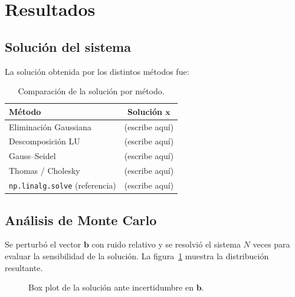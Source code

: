 \section{Resultados}
\label{sec:resultados}

% 

\subsection{Solución del sistema}
La solución obtenida por los distintos métodos fue:

\begin{table}[h]
	\centering
	\begin{tabular}{lc}
		\toprule
		Método & Solución $\mathbf{x}$ \\
		\midrule
		Eliminación Gaussiana & (escribe aquí) \\
		Descomposición LU     & (escribe aquí) \\
		Gauss--Seidel         & (escribe aquí) \\
		Thomas / Cholesky     & (escribe aquí) \\
		\texttt{np.linalg.solve} (referencia) & (escribe aquí) \\
		\bottomrule
	\end{tabular}
	\caption{Comparación de la solución por método.}
	\label{tab:metodos}
\end{table}

\subsection{Análisis de Monte Carlo}
Se perturbó el vector $\mathbf{b}$ con ruido relativo y se resolvió el sistema $N$ veces
para evaluar la sensibilidad de la solución. La figura~\ref{fig:montecarlo} muestra la
distribución resultante.

\begin{figure}[h]
	\centering
	\caption{Box plot de la solución ante incertidumbre en $\mathbf{b}$.}
	\label{fig:montecarlo}
\end{figure}

